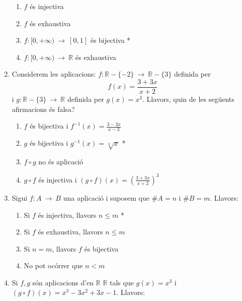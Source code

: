 \begin{enumerate}
\begin{enumerate}
\item $f$ \'{e}s injectiva

\item $f$ \'{e}s exhaustiva

\item $f:[0,+\infty )~\longrightarrow ~[0,1]$ \'{e}s bijectiva *

\item $f:[0,+\infty)~\longrightarrow~\mathbb{R}$ \'{e}s exhaustiva
\end{enumerate}

\item Considerem les aplicacions: $f:\mathbb{R}-\{-2\}~\longrightarrow ~%
\mathbb{R}-\{3\}$ definida per%
\begin{equation*}
f(x)=\frac{3+3x}{x+2}
\end{equation*}
i $g:\mathbb{R}-\{3\}~\longrightarrow~\mathbb{R}$ definida per $g(x)=x^{3}$.
Llavors, quin de les seg\"{u}ents afirmacions \'{e}s falsa?

\begin{enumerate}
\item $f$ \'{e}s bijectiva i $f^{-1}(x)=\frac{3-2x}{x-3}$

\item $g$ \'{e}s bijectiva i $g^{-1}(x)=\sqrt[3]{x}$ *

\item $f\circ g$ no \'{e}s aplicaci\'{o}

\item $g\circ f$ \'{e}s injectiva i $(g\circ f)(x)=\left( \frac{3+3x}{x+2}%
\right) ^{3}$
\end{enumerate}

\item Sigui $f:A~\longrightarrow~B$ una aplicaci\'{o} i suposem que $\#A=n$
i $\#B=m$. Llavors:

\begin{enumerate}
\item Si $f$ \'{e}s injectiva, llavors $n\leq m$ *

\item Si $f$ \'{e}s exhaustiva, llavors $n\leq m$

\item Si $n=m$, llavors $f$ \'{e}s bijectiva

\item No pot oc\'{o}rrer que $n<m$
\end{enumerate}

\item Si $f,g$ s\'{o}n aplicacions d'en $\mathbb{R}$ $\mathbb{R}$ tals que $%
g(x)=x^{3}$ i $(g\circ f)(x)=x^{3}-3x^{2}+3x-1$. Llavors:


\end{enumerate}
